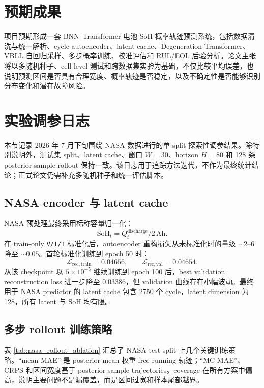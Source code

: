 \documentclass[11pt,a4paper,fontset=none]{ctexart}
\begin{document}
\section{预期成果}

项目预期形成一套 BNN--Transformer 电池 SoH 概率轨迹预测系统，包括数据清洗与统一解析、cycle autoencoder、latent cache、Degeneration Transformer、VBLL 自回归采样、多步概率训练、校准评估和 RUL/EOL 后验分析。论文主张将以多随机种子、cell-level 测试和跨数据集实验为基础，不仅比较平均误差，也说明预测区间是否具有合理宽度、概率轨迹是否稳定，以及不确定性是否能够识别分布变化和潜在故障风险。

\appendix
\section{实验调参日志}

本节记录 2026 年 7 月下旬围绕 NASA 数据进行的单 split 探索性调参结果。除特别说明外，测试集 split、latent cache、窗口 $W=30$、horizon $H=80$ 和 128 条 posterior sample rollout 保持一致。该日志用于追踪方法迭代，不作为最终统计结论；正式论文仍需补充多随机种子和统一评估脚本。

\subsection{NASA encoder 与 latent cache}

NASA 预处理最终采用标称容量归一化：
\[
\mathrm{SoH}_t=Q_t^{\mathrm{discharge}}/2\,\mathrm{Ah}.
\]
在 train-only \texttt{V/I/T} 标准化后，autoencoder 重构损失从未标准化时的量级 $\sim 2$--$6$ 降至 $\sim 0.05$。首轮标准化训练到 epoch 50 时：
\[
\mathcal L_{\mathrm{rec,train}}=0.04656,\qquad
\mathcal L_{\mathrm{rec,val}}=0.04654.
\]
从该 checkpoint 以 $5\times10^{-5}$ 继续训练到 epoch 100 后，best validation reconstruction loss 进一步降至 $0.03386$，但 validation 曲线存在小幅波动。最终用于 NASA predictor 的 latent cache 包含 2750 个 cycle，latent dimension 为 128，所有 latent 与 SoH 均有限。

\subsection{多步 rollout 训练策略}

表 \ref{tab:nasa_rollout_ablation} 汇总了 NASA test split 上几个关键训练策略。``mean MAE'' 是 posterior-mean 权重 free-running 轨迹；``MC MAE''、CRPS 和区间宽度基于 posterior sample trajectories。coverage 在所有方案中偏高，说明主要问题不是漏覆盖，而是区间过宽和样本尾部越界。
\end{document}
